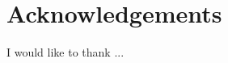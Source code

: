 %
%
%
%
%
%

\section*{Acknowledgements}
\label{acknowledgements_heading}

I would like to thank ...
